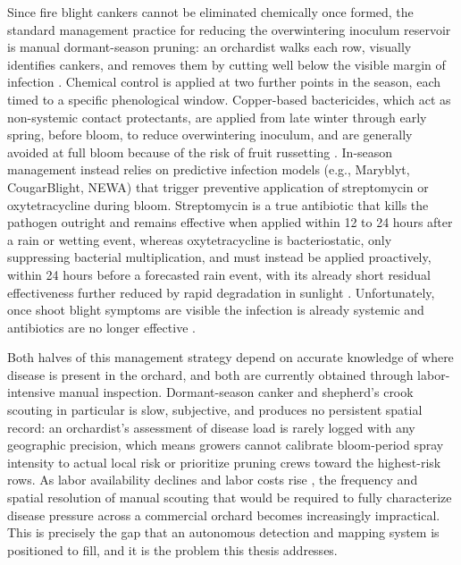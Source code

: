 Since fire blight cankers cannot be eliminated chemically once formed, the
standard management practice for reducing the overwintering inoculum reservoir
is manual dormant-season pruning: an orchardist walks each row, visually
identifies cankers, and removes them by cutting well below the visible margin
of infection \cite{Peter2023PennStateExtension}.
Chemical control is applied at two further points in the season, each timed
to a specific phenological window. Copper-based bactericides, which act as
non-systemic contact protectants, are applied from late winter through early
spring, before bloom, to reduce overwintering inoculum, and are generally
avoided at full bloom because of the risk of fruit russetting
\cite{Holland2025WisconsinFireBlightManagement}. In-season management instead relies on predictive infection models (e.g.,
Maryblyt, CougarBlight, NEWA) that trigger preventive application of
streptomycin or oxytetracycline during bloom. Streptomycin is a true
antibiotic that kills the pathogen outright and remains effective when
applied within 12 to 24 hours after a rain or wetting event, whereas
oxytetracycline is bacteriostatic, only suppressing bacterial multiplication,
and must instead be applied proactively, within 24 hours before a forecasted
rain event, with its already short residual effectiveness further reduced by
rapid degradation in sunlight
\cite{Holland2025WisconsinFireBlightManagement}. Unfortunately, once shoot
blight symptoms are visible the infection is already systemic and antibiotics
are no longer effective
\cite{Norelli2003FireBlightManagementTwentyFirst, acimovic2026fireblight}.

Both halves of this management strategy depend on accurate knowledge of where
disease is present in the orchard, and both are currently obtained through
labor-intensive manual inspection.
Dormant-season canker and shepherd's crook scouting in particular is slow,
subjective, and produces no persistent spatial record: an orchardist's
assessment of disease load is rarely logged with any geographic precision,
which means growers cannot calibrate bloom-period spray intensity to actual
local risk or prioritize pruning crews toward the highest-risk rows.
As labor availability declines and labor costs rise \cite{gerlach2025usapple},
the frequency and spatial resolution of manual scouting that would be required
to fully characterize disease pressure across a commercial orchard becomes
increasingly impractical.
This is precisely the gap that an autonomous detection and mapping system is
positioned to fill, and it is the problem this thesis addresses.

